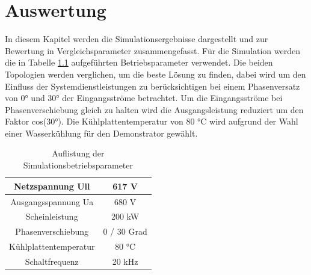 \chapter{Auswertung}
In diesem Kapitel werden die Simulationsergebnisse dargestellt und zur Bewertung in Vergleichsparameter zusammengefasst. Für die Simulation werden die in Tabelle \ref{tab:Betriebspara} aufgeführten Betriebsparameter verwendet. Die beiden Topologien werden verglichen, um die beste Lösung zu finden, dabei wird um den Einfluss der Systemdienstleistungen zu berücksichtigen bei einem Phasenversatz von 0° und 30° der Eingangsströme betrachtet. Um die Eingangsströme bei Phasenverschiebung gleich zu halten wird die Ausgangsleistung reduziert um den Faktor cos(30°). Die Kühlplattentemperatur von 80 °C wird aufgrund der Wahl einer Wasserkühlung für den Demonstrator gewählt.

\begin{table}
	\centering
	\caption{Auflistung der Simulationsbetriebsparameter}
\begin{tabular}{|c|c|}
	\hline
	Netzspannung \gls{Ull} & 617 \si{\volt} \\
	\hline
	Ausgangsspannung \gls{Ua} & 680 V \\
	\hline
	Scheinleistung & 200 kW \\
	\hline
	Phasenverschiebung & 0 / 30 Grad \\
	\hline
	Kühlplattentemperatur & 80 °C \\
	\hline
	Schaltfrequenz & 20 kHz \\
	\hline
\end{tabular}

\label{tab:Betriebspara}
\end{table}


